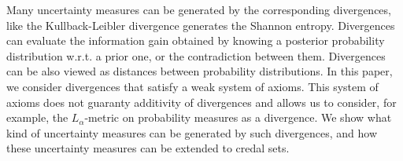 
Many uncertainty measures can be generated by the corresponding divergences, like the Kullback-Leibler divergence generates the Shannon entropy. Divergences can evaluate the information gain obtained by knowing a posterior probability distribution w.r.t. a prior one, or the contradiction between them. Divergences can be also viewed as distances between probability distributions.  
In this paper, we consider divergences that satisfy a weak system of axioms. This system of axioms does not guaranty additivity of divergences and allows us to consider, for example, the ${L_\alpha }$-metric on probability measures as a divergence. We show what kind of uncertainty measures can be generated by such divergences, and how these uncertainty measures can be extended to credal sets.



